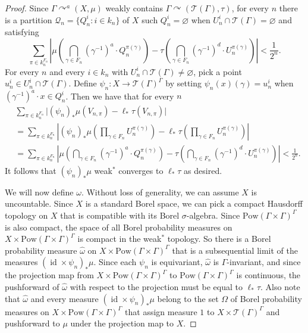 \documentclass[12pt]{amsart}
\theoremstyle{definition}
\def\cal{\mathcal}
\DeclareMathOperator{\id}{id}
\newcommand{\acts}{\curvearrowright}
\newcommand{\Pow}[1]{\mathrm{Pow}(#1)}
\begin{document}
\begin{proof}
	Since $\Gamma \acts^a (X, \mu)$ weakly contains $\Gamma \acts (\cal T(\Gamma), \tau)$, for every $n$ there is a partition $\cal Q_n = \{Q_n^i : i \in k_n\}$ of $X$ such $Q_n^i = \varnothing$ when $U_n^i \cap \cal T(\Gamma) = \varnothing$ and satisfying
	\begin{equation} \label{eq:weaklift}
		\sum_{\pi \in k_n^{F_n}} \left| \mu \left( \bigcap_{\gamma \in F_n} (\gamma^{-1})^a \cdot Q_n^{\pi(\gamma)} \right) - \tau \left( \bigcap_{\gamma \in F_n} (\gamma^{-1})^d \cdot U_n^{\pi(\gamma)} \right) \right| < \frac{1}{2^n}.
	\end{equation}
	For every $n$ and every $i \in k_n$ with $U_n^i \cap \cal T(\Gamma) \neq \varnothing$, pick a point $u_n^i \in U_n^i \cap \cal T(\Gamma)$. Define $\psi_n : X \rightarrow \cal T(\Gamma)^\Gamma$ by setting $\psi_n(x)(\gamma) = u_n^i$ when $(\gamma^{-1})^a \cdot x \in Q_n^i$. Then we have that for every $n$
	\begin{align*}
		& \sum_{\pi \in k_n^{F_n}} \Big| (\psi_n)_* \mu (V_{n,\pi}) - \ell_*\tau (V_{n,\pi}) \Big|\\
		& = \sum_{\pi \in k_n^{F_n}} \left| (\psi_n)_* \mu \left( \prod_{\gamma \in F_n} U_n^{\pi(\gamma)} \right) - \ell_* \tau \left( \prod_{\gamma \in F_n} U_n^{\pi(\gamma)} \right) \right|\\
		& = \sum_{\pi \in k_n^{F_n}} \left| \mu \left( \bigcap_{\gamma \in F_n} (\gamma^{-1})^a \cdot Q_n^{\pi(\gamma)} \right) - \tau \left( \bigcap_{\gamma \in F_n} (\gamma^{-1})^d \cdot U_n^{\pi(\gamma)} \right) \right| < \frac{1}{2^n}.
	\end{align*}
	It follows that $(\psi_n)_* \mu$ weak$^*$ converges to $\ell_* \tau$ as desired.
	
	We will now define $\omega$. Without loss of generality, we can assume $X$ is uncountable. Since $X$ is a standard Borel space, we can pick a compact Hausdorff topology on $X$ that is compatible with its Borel $\sigma$-algebra. Since $\Pow{\Gamma \times \Gamma}^\Gamma$ is also compact, the space of all Borel probability measures on $X \times \Pow{\Gamma \times \Gamma}^\Gamma$ is compact in the weak$^*$ topology. So there is a Borel probability measure $\widehat \omega$ on $X \times \Pow{\Gamma \times \Gamma}^\Gamma$ that is a subsequential limit of the measures $(\id \times \psi_n)_* \mu$. Since each $\psi_n$ is equivariant, $\widehat \omega$ is $\Gamma$-invariant, and since the projection map from $X \times \Pow{\Gamma \times \Gamma}^\Gamma$ to $\Pow{\Gamma \times \Gamma}^\Gamma$ is continuous, the pushforward of $\widehat \omega$ with respect to the projection must be equal to $\ell_* \tau$. Also note that $\widehat \omega$ and every measure $(\id \times \psi_n)_* \mu$ belong to the set $\Omega$ of Borel probability measures on $X \times \Pow{\Gamma \times \Gamma}^\Gamma$ that assign measure $1$ to $X \times \cal T(\Gamma)^\Gamma$ and pushforward to $\mu$ under the projection map to $X$.
    

\end{proof}
\end{document}
